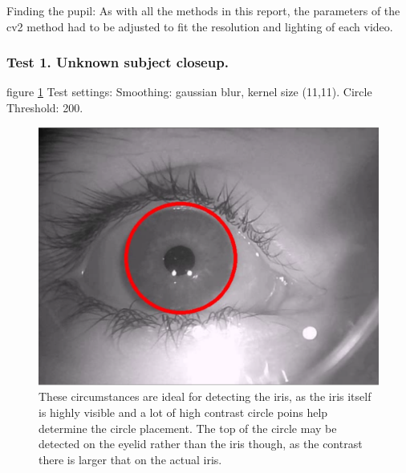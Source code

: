 Finding the pupil: As with all the methods in this report, the
parameters of the cv2 method had to be adjusted to fit the resolution
and lighting of each video.

\subsubsection{Test 1. Unknown subject closeup.}

figure \ref{hough7} Test settings: Smoothing: gaussian blur, kernel size
(11,11). Circle Threshold: 200.

\begin{figure}[htbp]
\centering
\includegraphics{pics/hough/7.png}
\caption{These circumstances are ideal for detecting the iris, as the
iris itself is highly visible and a lot of high contrast circle poins
help determine the circle placement. The top of the circle may be
detected on the eyelid rather than the iris though, as the contrast
there is larger that on the actual iris. \label{hough7}}
\end{figure}

